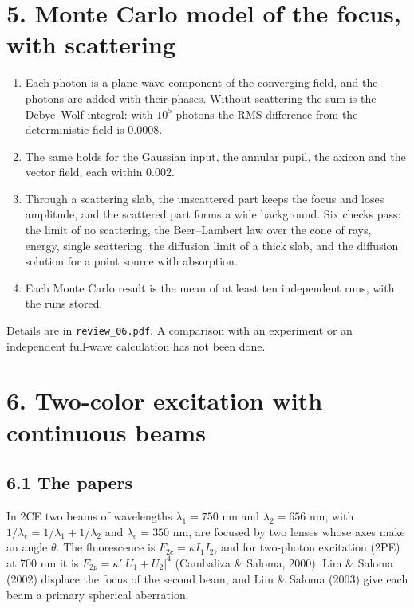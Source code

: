 \documentclass[10pt]{article}
\begin{document}
\section*{5. Monte Carlo model of the focus, with scattering}
\begin{enumerate}
\item Each photon is a plane-wave component of the converging field, and the photons are added with their phases.
Without scattering the sum is the Debye--Wolf integral: with $10^5$ photons the RMS difference from the
deterministic field is 0.0008.
\item The same holds for the Gaussian input, the annular pupil, the axicon and the vector field, each within 0.002.
\item Through a scattering slab, the unscattered part keeps the focus and loses amplitude, and the scattered part
forms a wide background. Six checks pass: the limit of no scattering, the Beer--Lambert law over the cone of rays,
energy, single scattering, the diffusion limit of a thick slab, and the diffusion solution for a point source with
absorption.
\item Each Monte Carlo result is the mean of at least ten independent runs, with the runs stored.
\end{enumerate}
Details are in \texttt{review\_06.pdf}. A comparison with an experiment or an independent full-wave calculation has
not been done.

\section*{6. Two-color excitation with continuous beams}
\subsection*{6.1 The papers}
In 2CE two beams of wavelengths $\lambda_1 = 750$ nm and $\lambda_2 = 656$ nm, with
$1/\lambda_e = 1/\lambda_1 + 1/\lambda_2$ and $\lambda_e = 350$ nm, are focused by two lenses whose axes make an
angle $\theta$. The fluorescence is $F_{2c} = \kappa I_1I_2$, and for two-photon excitation (2PE) at 700 nm it is
$F_{2p} = \kappa'|U_1+U_2|^4$ (Cambaliza \& Saloma, 2000). Lim \& Saloma (2002) displace the focus of the second
beam, and Lim \& Saloma (2003) give each beam a primary spherical aberration.
\end{document}
